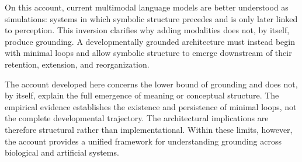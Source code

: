 \documentclass[11pt]{article}
\begin{document}
On this account, current multimodal language models are better
understood as simulations: systems in which symbolic structure precedes
and is only later linked to perception. This inversion clarifies why
adding modalities does not, by itself, produce grounding. A
developmentally grounded architecture must instead begin with minimal
loops and allow symbolic structure to emerge downstream of their
retention, extension, and reorganization.

The account developed here concerns the lower bound of grounding and
does not, by itself, explain the full emergence of meaning or
conceptual structure. The empirical evidence establishes the existence
and persistence of minimal loops, not the complete developmental
trajectory. The architectural implications are therefore structural
rather than implementational. Within these limits, however, the
account provides a unified framework for understanding grounding across
biological and artificial systems.



\end{document}
